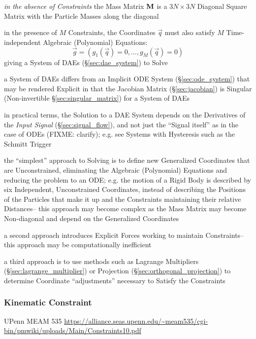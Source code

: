 \emph{in the absence of Constraints} the Mass Matrix $\mathbf{M}$ is a $3N \times
3N$ Diagonal Square Matrix with the Particle Masses along the diagonal

in the presence of $M$ Constraints, the Coordinates $\vec{q}$ must also satisfy
$M$ Time-independent Algebraic (Polynomial) Equations:
\[
  \vec{g} = (g_1(\vec{q}) = 0, \ldots, g_M(\vec{q}) = 0)
\]
giving a System of DAEs (\S\ref{sec:dae_system}) to Solve

\fist a System of DAEs differs from an Implicit ODE System
(\S\ref{sec:ode_system}) that may be rendered Explicit in that the Jacobian
Matrix (\S\ref{sec:jacobian}) is Singular (Non-invertible
\S\ref{sec:singular_matrix}) for a System of DAEs

in practical terms, the Solution to a DAE System depends on the Derivatives of
the \emph{Input Signal} (\S\ref{sec:signal_flow}), and not just the ``Signal
itself'' as in the case of ODEs (FIXME: clarify); e.g. see Systems with
Hysteresis such as the Schmitt Trigger

the ``simplest'' approach to Solving is to define new Generalized Coordinates
that are Unconstrained, eliminating the Algebraic (Polynomial) Equations and
reducing the problem to an ODE; e.g. the motion of a Rigid Body is described by
six Independent, Unconstrained Coordinates, instead of describing the Positions
of the Particles that make it up and the Constraints maintaining their relative
Distances-- this approach may become complex as the Mass Matrix may become
Non-diagonal and depend on the Generalized Coordinates

a second approach introduces Explicit Forces working to maintain Constraints--
this approach may be computationally inefficient

a third approach is to use methods such as Lagrange Multipliers
(\S\ref{sec:lagrange_multiplier}) or Projection
(\S\ref{sec:orthogonal_projection}) to determine Coordinate ``adjustments''
necessary to Satisfy the Constraints



\subsubsection{Kinematic Constraint}\label{sec:kinematic_constraint}


UPenn MEAM 535
\url{https://alliance.seas.upenn.edu/~meam535/cgi-bin/pmwiki/uploads/Main/Constraints10.pdf}



